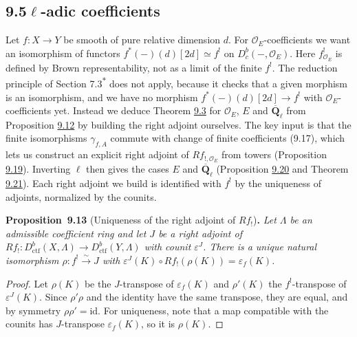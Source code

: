 \documentclass[11pt]{article}
\newenvironment{bpstatement}[2]{\par\addvspace{0.6\baselineskip}\noindent\textbf{#1}#2\textbf{.}\enspace\ignorespaces}
  {\par\addvspace{0.4\baselineskip}}
\newenvironment{bpstatementit}[2]{\begin{bpstatement}{#1}{#2}\itshape\ignorespaces}{\end{bpstatement}}
\newcommand{\bpout}[1]{#1\textsuperscript{\hyperlink{bp-outside}{\ensuremath{\ast}}}}
\providecommand{\Dbc}{}\renewcommand{\Dbc}{D^b_c}
\begin{document}
\subsection*{\texorpdfstring{9.5\quad $\ell$-adic coefficients}{9.5 ell-adic coefficients}}
\label{bp39}%
\label{bp40}%
Let \(f:X\to Y\) be smooth of pure relative dimension \(d\). For \(\mathcal O_E\)-coefficients we want an isomorphism of functors \(f^*(-)(d)[2d]\simeq f^!\) on \(\Dbc(-,\mathcal O_E)\). Here \(f^!_{\mathcal O_E}\) is defined by Brown representability, not as a limit of the finite \(f^!\). The reduction principle of Section \bpout{7.3} does not apply, because it checks that a given morphism is an isomorphism, and we have no morphism \(f^*(-)(d)[2d]\to f^!\) with \(\mathcal O_E\)-coefficients yet. Instead we deduce Theorem \hyperref[bp9]{9.3} for \(\mathcal O_E\), \(E\) and \(\overline{\mathbf Q}_\ell\) from Proposition \hyperref[bp37]{9.12} by building the right adjoint ourselves. The key input is that the finite isomorphisms \(\gamma_{f,A}\) commute with change of finite coefficients (9.17), which lets us construct an explicit right adjoint of \(Rf_{!,\mathcal O_E}\) from towers (Proposition \hyperref[bp61]{9.19}). Inverting \(\ell\) then gives the cases \(E\) and \(\overline{\mathbf Q}_\ell\) (Proposition \hyperref[bp66]{9.20} and Theorem \hyperref[bp69]{9.21}). Each right adjoint we build is identified with \(f^!\) by the uniqueness of adjoints, normalized by the counits.

\label{bp41}%
\begin{bpstatementit}{Proposition~9.13}{ (Uniqueness of the right adjoint of $Rf_!$)}
Let \(\Lambda\) be an admissible coefficient ring and let \(J\) be a right adjoint of \(Rf_!:D^b_{\mathrm{ctf}}(X,\Lambda)\to D^b_{\mathrm{ctf}}(Y,\Lambda)\) with counit \(\varepsilon^J\). There is a unique natural isomorphism \(\rho:f^!\xrightarrow{\sim}J\) with \(\varepsilon^J(K)\circ Rf_!(\rho(K))=\varepsilon_f(K)\).
\end{bpstatementit}

\begin{proof}[{Proof}]\label{bp42}%
Let \(\rho(K)\) be the \(J\)-transpose of \(\varepsilon_f(K)\) and \(\rho'(K)\) the \(f^!\)-transpose of \(\varepsilon^J(K)\). Since \(\rho'\rho\) and the identity have the same transpose, they are equal, and by symmetry \(\rho\rho'=\mathrm{id}\). For uniqueness, note that a map compatible with the counits has \(J\)-transpose \(\varepsilon_f(K)\), so it is \(\rho(K)\).
\end{proof}
\end{document}
